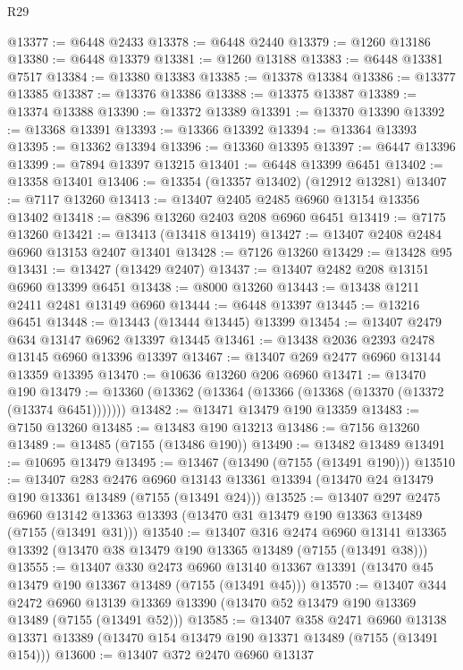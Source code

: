 \begin{lexlean}{R29}
\begin{coremodule}
@13377 := @6448 @2433
@13378 := @6448 @2440
@13379 := @1260 @13186
@13380 := @6448 @13379
@13381 := @1260 @13188
@13383 := @6448 @13381 @7517
@13384 := @13380 @13383
@13385 := @13378 @13384
@13386 := @13377 @13385
@13387 := @13376 @13386
@13388 := @13375 @13387
@13389 := @13374 @13388
@13390 := @13372 @13389
@13391 := @13370 @13390
@13392 := @13368 @13391
@13393 := @13366 @13392
@13394 := @13364 @13393
@13395 := @13362 @13394
@13396 := @13360 @13395
@13397 := @6447 @13396
@13399 := @7894 @13397 @13215
@13401 := @6448 @13399 @6451
@13402 := @13358 @13401
@13406 := @13354 (@13357 @13402) (@12912 @13281)
@13407 := @7117 @13260
@13413 := @13407 @2405 @2485 @6960 @13154 @13356 @13402
@13418 := @8396 @13260 @2403 @208 @6960 @6451
@13419 := @7175 @13260
@13421 := @13413 (@13418 @13419)
@13427 := @13407 @2408 @2484 @6960 @13153 @2407 @13401
@13428 := @7126 @13260
@13429 := @13428 @95
@13431 := @13427 (@13429 @2407)
@13437 := @13407 @2482 @208 @13151 @6960 @13399 @6451
@13438 := @8000 @13260
@13443 := @13438 @1211 @2411 @2481 @13149 @6960
@13444 := @6448 @13397
@13445 := @13216 @6451
@13448 := @13443 (@13444 @13445) @13399
@13454 := @13407 @2479 @634 @13147 @6962 @13397 @13445
@13461 := @13438 @2036 @2393 @2478 @13145 @6960 @13396 @13397
@13467 := @13407 @269 @2477 @6960 @13144 @13359 @13395
@13470 := @10636 @13260 @206 @6960
@13471 := @13470 @190
@13479 := @13360 (@13362 (@13364 (@13366 (@13368 (@13370 (@13372 (@13374 @6451)))))))
@13482 := @13471 @13479 @190 @13359
@13483 := @7150 @13260
@13485 := @13483 @190 @13213
@13486 := @7156 @13260
@13489 := @13485 (@7155 (@13486 @190))
@13490 := @13482 @13489
@13491 := @10695 @13479
@13495 := @13467 (@13490 (@7155 (@13491 @190)))
@13510 := @13407
    @283
    @2476
    @6960
    @13143
    @13361
    @13394
    (@13470 @24 @13479 @190 @13361 @13489 (@7155 (@13491 @24)))
@13525 := @13407
    @297
    @2475
    @6960
    @13142
    @13363
    @13393
    (@13470 @31 @13479 @190 @13363 @13489 (@7155 (@13491 @31)))
@13540 := @13407
    @316
    @2474
    @6960
    @13141
    @13365
    @13392
    (@13470 @38 @13479 @190 @13365 @13489 (@7155 (@13491 @38)))
@13555 := @13407
    @330
    @2473
    @6960
    @13140
    @13367
    @13391
    (@13470 @45 @13479 @190 @13367 @13489 (@7155 (@13491 @45)))
@13570 := @13407
    @344
    @2472
    @6960
    @13139
    @13369
    @13390
    (@13470 @52 @13479 @190 @13369 @13489 (@7155 (@13491 @52)))
@13585 := @13407
    @358
    @2471
    @6960
    @13138
    @13371
    @13389
    (@13470 @154 @13479 @190 @13371 @13489 (@7155 (@13491 @154)))
@13600 := @13407
    @372
    @2470
    @6960
    @13137

\end{coremodule}
\end{lexlean}
